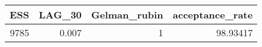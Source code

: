 \begin{longtable}{rrrr}
\toprule
ESS & LAG\_30 & Gelman\_rubin & acceptance\_rate \\ 
\midrule
9785 & 0.007 & 1 & 98.93417 \\ 
\bottomrule
\end{longtable}

